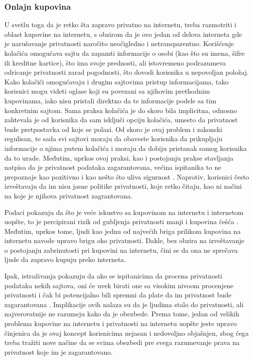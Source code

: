 \documentclass[a4paper]{article}
\begin{document}
\subsubsection{Onlajn kupovina}
U svetlu toga da je retko šta zapravo privatno na internetu, treba razmotriti i oblast kupovine na internetu, s obzirom da je ovo jedan od delova interneta gde je narušavanje privatnosti naročito neočigledno i netransparentno. Korišćenje kolačića omogućava sajtu da zapamti informacije o osobi (kao što su imena, šifre ili kreditne kartice), što ima svoje prednosti, ali istovremeno podrazumeva odricanje privatnosti zarad pogodnosti, što dovodi korisnika u nepovoljan položaj. Kako kolačići omogućavaju i drugim sajtovima pristup informacijama, tako korisnici mogu videti oglase koji su povezani sa njihovim prethodnim kupovinama, iako nisu pristali direktno da te informacije podele sa tim konkretnim sajtom. Sama praksa kolačića je do skoro bila implicitna, odnosno zahtevala je od korisnika da sam isključi opciju kolačića, umesto da privatnost bude pretpostavka od koje se polazi. Od skoro je ovaj problem i zakonski regulisan, te sada svi sajtovi moraju da obaveste korisnika da prikupljaju informacije o njima putem kolačića i moraju da dobiju pristanak samog korisnika da to urade. Međutim, uprkos ovoj praksi, kao i postojanju prakse stavljanja natpisa da je privatnost podataka zagarantovana, većina ispitanika to ne prepoznaje kao pozitivno i kao nešto što uliva sigurnost \cite{cookies2}. Naprotiv, korisnici često izveštavaju da im nisu jasne politike privatnosti, koje retko čitaju, kao ni načini na koje je njihova privatnost zagrantovana.
\par Podaci pokazuju da što je veće iskustvo sa kupovinom na internetu i internetom uopšte, to je percipirani rizik od gubljenja privatnosti manji i kupovina češća \cite{cookies3}. Međutim, uprkos tome, ljudi kao jednu od najvećih briga prilikom kupovina na internetu navode upravo brigu oko privatnosti. Dakle, bez obzira na izveštavanje o postojanju zabrinutosti pri kupovini na internetu, čini se da ona ne sprečava ljude da zapravo kupuju preko interneta.
\par Ipak, istraživanja pokazuju da ako se ispitanicima da procena privatnosti podataka nekih sajtova, oni će uvek birati one sa visokim nivoom procenjene privatnosti i čak bi potencijalno bili spremni da plate da im privatnost bude zagarantovana \cite{cookies2}. Implikacije ovih nalaza su da je ljudima stalo do privatnosti, ali najverovatnije ne razumeju kako da je obezbede. Prema tome, jedan od velikih problema kupovine na internetu i privatnosti na internetu uopšte jeste upravo činjenica da je ovaj koncept korisnicima nejasan i nedovoljno objašnjen, zbog čega treba tražiti nove načine da se svima obezbedi pre svega razumevanje prava na privatnost koje im je zagarantovano.
\end{document}
